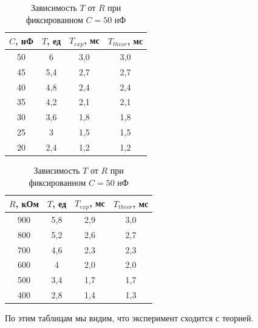 \documentclass[a4paper, 12pt]{article}%
\begin{document}
\begin{table}[h]
\begin{center}
\begin{tabular}{|c|c|c|c|}
\hline
$C$, нФ & $T$, ед & $T_{exp}$, мс & $T_{theor}$, мс \\ \hline
50      & 6       & 3,0           & 3,0            \\ \hline
45      & 5,4     & 2,7           & 2,7            \\ \hline
40      & 4,8     & 2,4           & 2,4            \\ \hline
35      & 4,2     & 2,1           & 2,1            \\ \hline
30      & 3,6     & 1,8           & 1,8            \\ \hline
25      & 3       & 1,5           & 1,5            \\ \hline
20      & 2,4     & 1,2           & 1,2            \\ \hline
\end{tabular}
\caption{Зависимость $T$ от $C$ при фиксированном $R = 900$ кОм}

\begin{tabular}{|c|c|c|c|}
\hline
$R$, кОм & $T$, ед & $T_{exp}$, мс & $T_{theor}$, мс \\ \hline
900      & 5,8     & 2,9           & 3,0            \\ \hline
800      & 5,2     & 2,6           & 2,7            \\ \hline
700      & 4,6     & 2,3           & 2,3            \\ \hline
600      & 4       & 2,0           & 2,0            \\ \hline
500      & 3,4     & 1,7           & 1,7            \\ \hline
400      & 2,8     & 1,4           & 1,3            \\ \hline
\end{tabular}
\caption{Зависимость $T$ от $R$ при фиксированном $C = 50$ нФ}
\end{center}
\end{table}

По этим таблицам мы видим, что эксперимент сходится с теорией.
\newpage 
\end{document}
